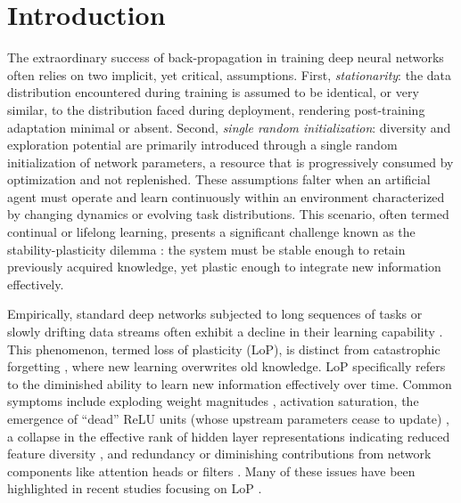 \documentclass{article}
\numberwithin{figure}{section}
\begin{document}
\section{Introduction}
The extraordinary success of back-propagation in training deep neural networks often relies on two implicit, yet critical, assumptions. First, \emph{stationarity}: the data distribution encountered during training is assumed to be identical, or very similar, to the distribution faced during deployment, rendering post-training adaptation minimal or absent. Second, \emph{single random initialization}: diversity and exploration potential are primarily introduced through a single random initialization of network parameters, a resource that is progressively consumed by optimization and not replenished. These assumptions falter when an artificial agent must operate and learn continuously within an environment characterized by changing dynamics or evolving task distributions. This scenario, often termed continual or lifelong learning, presents a significant challenge known as the stability-plasticity dilemma \citep{abraham2005memory, chaudhry2018riemannian}: the system must be stable enough to retain previously acquired knowledge, yet plastic enough to integrate new information effectively.

Empirically, standard deep networks subjected to long sequences of tasks or slowly drifting data streams often exhibit a decline in their learning capability \citep{dohare2024loss, berariu2021plasticity, dohare2021continual, nikishin2022primacy, lyle2023understanding}. This phenomenon, termed loss of plasticity (LoP), is distinct from catastrophic forgetting \citep{mccloskey1989catastrophic, ratcliff1990connectionist, french1999catastrophic}, where new learning overwrites old knowledge. LoP specifically refers to the diminished ability to learn new information effectively over time. Common symptoms include exploding weight magnitudes \citep{nikishin2022primacy}, activation saturation, the emergence of ``dead'' ReLU units (whose upstream parameters cease to update) \citep{nair2010rectified, sokar2023dormant, dohare2021continual, lyle2022understanding}, a collapse in the effective rank of hidden layer representations indicating reduced feature diversity \citep{papyan2020prevalence, huh2022lowrank, kumar2020implicit, gulcehre2022empirical}, and redundancy or diminishing contributions from network components like attention heads or filters \citep{lyle2023understanding}. Many of these issues have been highlighted in recent studies focusing on LoP \citep{dohare2023maintaining, kumar2024regenerative, ash2020warmstarting}.
\end{document}
